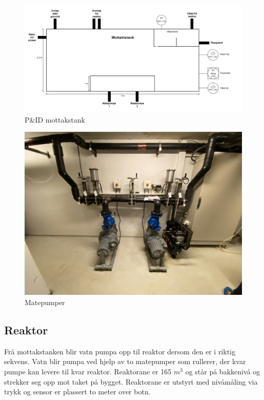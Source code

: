 \begin{figure}[htbp]
    \centering
    \includegraphics[width=1\textwidth]{Figurar/Mottakstank.png}
    \caption{P\&ID mottakstank}\label{fig:Mottakstank}
\end{figure}

\begin{figure}[htbp]
    \centering
    \includegraphics[width=1\textwidth]{Bilder/Bilde pumper.jpg}
    \caption{Matepumper}\label{fig:Matepumper}
\end{figure}

\newpage
\subsection{Reaktor}

Frå mottakstanken blir vatn pumpa opp til reaktor dersom den er i riktig sekvens.
Vatn blir pumpa ved hjelp av to matepumper som rullerer, der kvar pumpe kan levere til kvar reaktor. 
Reaktorane er 165 $m^3$ og står på bakkenivå og strekker seg opp mot taket på bygget.
Reaktorane er utstyrt med nivåmåling via trykk og sensor er plassert to meter over botn.

